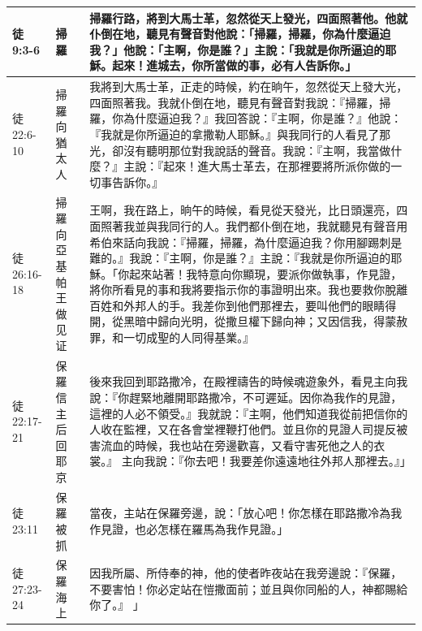 \begin{table}[H]
\begin{tabular}{p{5em}p{2.4em}p{40em}}
徒9:3-6&掃羅&掃羅行路，將到大馬士革，忽然從天上發光，四面照著他。他就仆倒在地，聽見有聲音對他說：「掃羅，掃羅，你為什麼逼迫我？」他說：「主啊，你是誰？」主說：「我就是你所逼迫的耶穌。起來！進城去，你所當做的事，必有人告訴你。」\\  \midrule
徒22:6-10&掃羅向猶太人&我將到大馬士革，正走的時候，約在晌午，忽然從天上發大光，四面照著我。我就仆倒在地，聽見有聲音對我說：『掃羅，掃羅，你為什麼逼迫我？』我回答說：『主啊，你是誰？』他說：『我就是你所逼迫的拿撒勒人耶穌。』與我同行的人看見了那光，卻沒有聽明那位對我說話的聲音。我說：『主啊，我當做什麼？』主說：『起來！進大馬士革去，在那裡要將所派你做的一切事告訴你。』\\  \midrule
徒26:16-18&掃羅向亞基帕王做见证&王啊，我在路上，晌午的時候，看見從天發光，比日頭還亮，四面照著我並與我同行的人。我們都仆倒在地，我就聽見有聲音用希伯來話向我說：『掃羅，掃羅，為什麼逼迫我？你用腳踢刺是難的。』我說：『主啊，你是誰？』主說：『我就是你所逼迫的耶穌。「你起來站著！我特意向你顯現，要派你做執事，作見證，將你所看見的事和我將要指示你的事證明出來。我也要救你脫離百姓和外邦人的手。我差你到他們那裡去，要叫他們的眼睛得開，從黑暗中歸向光明，從撒旦權下歸向神；又因信我，得蒙赦罪，和一切成聖的人同得基業。』\\  \midrule
徒22:17-21&保羅信主后回耶京&後來我回到耶路撒冷，在殿裡禱告的時候魂遊象外，看見主向我說：『你趕緊地離開耶路撒冷，不可遲延。因你為我作的見證，這裡的人必不領受。』我就說：『主啊，他們知道我從前把信你的人收在監裡，又在各會堂裡鞭打他們。並且你的見證人司提反被害流血的時候，我也站在旁邊歡喜，又看守害死他之人的衣裳。』 主向我說：『你去吧！我要差你遠遠地往外邦人那裡去。』」\\  \midrule

徒23:11&保羅被抓&當夜，主站在保羅旁邊，說：「放心吧！你怎樣在耶路撒冷為我作見證，也必怎樣在羅馬為我作見證。」\\  \midrule

徒27:23-24&保羅海上&因我所屬、所侍奉的神，他的使者昨夜站在我旁邊說：『保羅，不要害怕！你必定站在愷撒面前；並且與你同船的人，神都賜給你了。』 」\\\bottomrule
\end{tabular}%
\end{table}
　

